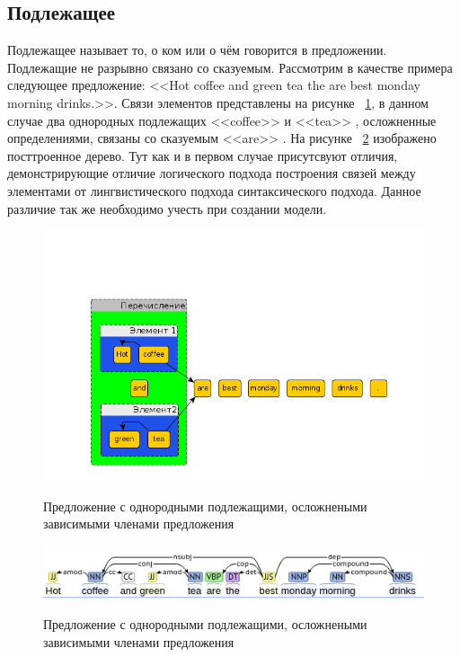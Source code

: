 \documentclass{standalone}
\begin{document}
\subsection{Подлежащее} %
\par Подлежащее называет то, о ком или о чём говорится в предложении. Подлежащие не разрывно связано со сказуемым. Рассмотрим в качестве примера следующее предложение: <<Hot coffee and green tea the are best monday morning drinks.>>. Связи элементов представлены на рисунке ~\ref{podlezhachie}, в данном случае два однородных подлежащих <<coffee>> и <<tea>> , осложненные определениями, связаны со сказуемым <<are>> . На рисунке ~\ref{podlezhachie2} изображено посттроенное дерево. Тут как и в первом случае присутсвуют отличия, демонстрирующие отличие логического подхода построения связей между элементами от лингвистического подхода синтаксического подхода. Данное различие так же необходимо учесть при создании модели.

\begin{figure}[!ht]
\includegraphics[width=\textwidth]{images/sentences1.png}
\label{podlezhachie}
\caption{Предложение с однородными подлежащими, осложнеными зависимыми членами предложения}
\end{figure}
\begin{figure}[!ht]
\includegraphics[width=\textwidth]{images/sentences11.png}
\label{podlezhachie2}
\caption{Предложение с однородными подлежащими, осложнеными зависимыми членами предложения}
\end{figure}
\newpage
\end{document}
